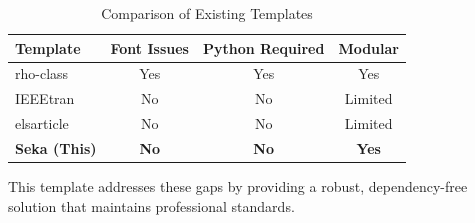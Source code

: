 \begin{table}[h]
\centering
\caption{Comparison of Existing Templates}
\label{tab:comparison}
\begin{tabular}{lccc}
\toprule
\textbf{Template} & \textbf{Font Issues} & \textbf{Python Required} & \textbf{Modular} \\
\midrule
rho-class & Yes & Yes & Yes \\
IEEEtran & No & No & Limited \\
elsarticle & No & No & Limited \\
\textbf{Seka (This)} & \textbf{No} & \textbf{No} & \textbf{Yes} \\
\bottomrule
\end{tabular}
\end{table}

This template addresses these gaps by providing a robust, dependency-free solution that maintains professional standards.